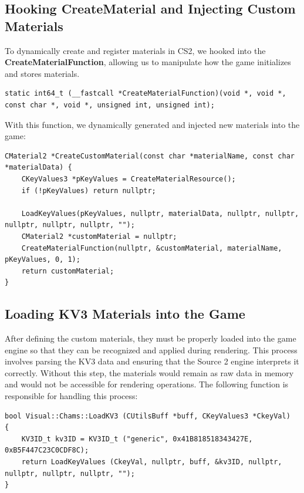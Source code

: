 \subsection{Hooking CreateMaterial and Injecting Custom Materials}

To dynamically create and register materials in CS2, we hooked into the \textbf{CreateMaterialFunction}, allowing us to manipulate how the game initializes and stores materials.

\begin{lstlisting}[style=cppstyle, caption={Hooking CreateMaterial Function}]
static int64_t (__fastcall *CreateMaterialFunction)(void *, void *, const char *, void *, unsigned int, unsigned int);
\end{lstlisting}

With this function, we dynamically generated and injected new materials into the game:

\begin{lstlisting}[style=cppstyle, caption={Creating a Custom Material in Memory}]
CMaterial2 *CreateCustomMaterial(const char *materialName, const char *materialData) {
    CKeyValues3 *pKeyValues = CreateMaterialResource();
    if (!pKeyValues) return nullptr;

    LoadKeyValues(pKeyValues, nullptr, materialData, nullptr, nullptr, nullptr, nullptr, nullptr, "");
    CMaterial2 *customMaterial = nullptr;
    CreateMaterialFunction(nullptr, &customMaterial, materialName, pKeyValues, 0, 1);
    return customMaterial;
}
\end{lstlisting}

\subsection{Loading KV3 Materials into the Game}  

After defining the custom materials, they must be properly loaded into the game engine so that they can be recognized and applied during rendering. This process involves parsing the KV3 data and ensuring that the Source 2 engine interprets it correctly. Without this step, the materials would remain as raw data in memory and would not be accessible for rendering operations. The following function is responsible for handling this process:  

\begin{lstlisting}[style=cppstyle, caption={Loading a KV3 Material into the Game}]
bool Visual::Chams::LoadKV3 (CUtilsBuff *buff, CKeyValues3 *CkeyVal) 
{
    KV3ID_t kv3ID = KV3ID_t ("generic", 0x41B818518343427E, 0xB5F447C23C0CDF8C);
    return LoadKeyValues (CkeyVal, nullptr, buff, &kv3ID, nullptr, nullptr, nullptr, nullptr, "");
}
\end{lstlisting}  

